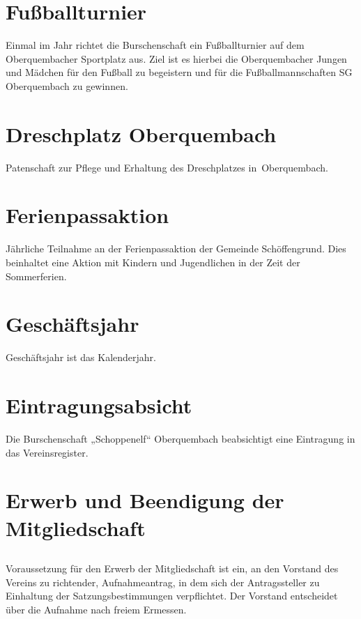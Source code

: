 \section{Fußballturnier}
Einmal im Jahr richtet die Burschenschaft ein Fußballturnier auf dem Oberquembacher Sportplatz aus.
Ziel ist es hierbei die Oberquembacher Jungen und Mädchen für den Fußball zu begeistern und für die Fußballmannschaften SG Oberquembach zu gewinnen.

\section{Dreschplatz Oberquembach}
Patenschaft zur Pflege und Erhaltung des Dreschplatzes in Oberquembach.

\section{Ferienpassaktion}
Jährliche Teilnahme an der Ferienpassaktion der Gemeinde Schöffengrund. Dies beinhaltet eine Aktion mit Kindern und Jugendlichen in der Zeit der Sommerferien.

\section{Geschäftsjahr}
Geschäftsjahr ist das Kalenderjahr.

\section{Eintragungsabsicht}
Die Burschenschaft „Schoppenelf“ Oberquembach beabsichtigt eine Eintragung in das Vereinsregister.

\section{Erwerb und Beendigung der Mitgliedschaft}
	\subsection{} Voraussetzung für den Erwerb der Mitgliedschaft ist ein, an den Vorstand des Vereins zu richtender, Aufnahmeantrag, in dem sich der Antragssteller zu Einhaltung der Satzungsbestimmungen verpflichtet. Der Vorstand entscheidet über die Aufnahme nach freiem Ermessen.
	
